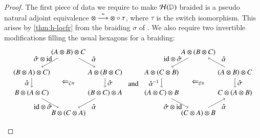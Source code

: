 \begin{proof}
  The first piece of data we require to make $\cH(\lD)$ braided is a
  pseudo natural adjoint equivalence $\mathord{\otimes} \too[\eqv]
  \mathord{\otimes}\circ \tau$, where $\tau$ is the switch
  isomorphism.  This arises by \autoref{thm:h-locfr} from the braiding $\sigma$
  of \lD.  We also require two invertible modifications filling the
  usual hexagons for a braiding:
  \begin{equation}
  \begin{aligned}
\begin{tikzpicture}[xscale=0.9]
\node (t) at (2,3) {$(A \otimes B) \otimes C$};
\node (tl) at (0,2) {$(B \otimes A) \otimes C)$};
\node (bl) at (0,1) {$B \otimes  (A \otimes C)$};
\node (b) at (2,0) {$B \otimes (C \otimes A)$};
\node (tr) at (4,2) {$A \otimes (B \otimes C)$};
\node (br) at (4,1) {$(B \otimes C) \otimes A$};
\draw[->] (t) to node [above,xshift=10pt, yshift=-2] {$\hat{\alpha}$} (tr);
\draw[->] (tr) to node [right] {$\hat{\sigma}$} (br);
\draw[->] (br) to node [below,xshift=10pt, yshift=2pt] {$\hat{\alpha}$} (b);
\draw[->] (t) to node [above,xshift=-10pt, yshift=-2pt] {$\hat{\sigma} \otimes \mbox{id}$} (tl);
\draw[->] (tl) to node [left] {$\hat{\alpha}$} (bl);
\draw[->] (bl) to node [below,xshift=-10pt,yshift=2pt] {$\mathid \otimes \hat{\sigma}$} (b);
\node at (2,1.5) {$\Leftarrow_{\zeta \iso}$};
\end{tikzpicture}
  \end{aligned}
\hspace{5pt}\mbox{and} \hspace{5pt}
\begin{aligned}
\begin{tikzpicture}[xscale=0.9]
\node (t) at (2,3) {$A \otimes (B \otimes C)$};
\node (tl) at (0,2) {$A \otimes (C \otimes B)$};
\node (bl) at (0,1) {$(A \otimes  C) \otimes B$};
\node (b) at (2,0) {$(C \otimes A) \otimes B$};
\node (tr) at (4,2) {$(A \otimes B) \otimes C$};
\node (br) at (4,1) {$C \otimes (A \otimes B)$};
\draw[->] (tr) to node [above,xshift=10pt, yshift=-2] {$\hat{\alpha}$} (t);
\draw[->] (tr) to node [right] {$\hat{\sigma} $} (br);
\draw[->] (b) to node [below,xshift=10pt, yshift=2pt] {$\hat{\alpha}$} (br);
\draw[->] (t) to node [above,xshift=-10pt, yshift=-2pt] {$\mbox{id} \otimes \hat{\sigma}$} (tl);
\draw[->] (tl) to node [left] {$\hat{\alpha}^{-1}$} (bl);
\draw[->] (bl) to node [below,xshift=-10pt,yshift=2pt] {$\hat{\sigma} \otimes \mathid$} (b);
\node at (2,1.5) {$\Leftarrow_{\xi \iso}$};
\end{tikzpicture}
\end{aligned}
\end{equation}


\end{proof}
